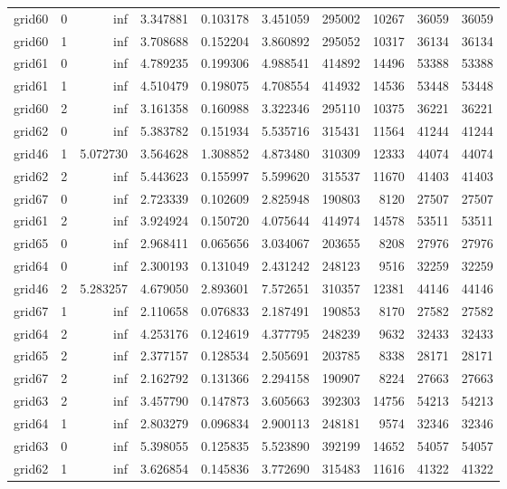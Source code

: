 \begin{longtable}{|l|r|r|r|r|r|r|r|r|r|}
grid60 & 0 & inf & 3.347881 & 0.103178 & 3.451059 & 295002 & 10267 & 36059 & 36059 \\
grid60 & 1 & inf & 3.708688 & 0.152204 & 3.860892 & 295052 & 10317 & 36134 & 36134 \\
grid61 & 0 & inf & 4.789235 & 0.199306 & 4.988541 & 414892 & 14496 & 53388 & 53388 \\
grid61 & 1 & inf & 4.510479 & 0.198075 & 4.708554 & 414932 & 14536 & 53448 & 53448 \\
grid60 & 2 & inf & 3.161358 & 0.160988 & 3.322346 & 295110 & 10375 & 36221 & 36221 \\
grid62 & 0 & inf & 5.383782 & 0.151934 & 5.535716 & 315431 & 11564 & 41244 & 41244 \\
grid46 & 1 & 5.072730 & 3.564628 & 1.308852 & 4.873480 & 310309 & 12333 & 44074 & 44074 \\
grid62 & 2 & inf & 5.443623 & 0.155997 & 5.599620 & 315537 & 11670 & 41403 & 41403 \\
grid67 & 0 & inf & 2.723339 & 0.102609 & 2.825948 & 190803 & 8120 & 27507 & 27507 \\
grid61 & 2 & inf & 3.924924 & 0.150720 & 4.075644 & 414974 & 14578 & 53511 & 53511 \\
grid65 & 0 & inf & 2.968411 & 0.065656 & 3.034067 & 203655 & 8208 & 27976 & 27976 \\
grid64 & 0 & inf & 2.300193 & 0.131049 & 2.431242 & 248123 & 9516 & 32259 & 32259 \\
grid46 & 2 & 5.283257 & 4.679050 & 2.893601 & 7.572651 & 310357 & 12381 & 44146 & 44146 \\
grid67 & 1 & inf & 2.110658 & 0.076833 & 2.187491 & 190853 & 8170 & 27582 & 27582 \\
grid64 & 2 & inf & 4.253176 & 0.124619 & 4.377795 & 248239 & 9632 & 32433 & 32433 \\
grid65 & 2 & inf & 2.377157 & 0.128534 & 2.505691 & 203785 & 8338 & 28171 & 28171 \\
grid67 & 2 & inf & 2.162792 & 0.131366 & 2.294158 & 190907 & 8224 & 27663 & 27663 \\
grid63 & 2 & inf & 3.457790 & 0.147873 & 3.605663 & 392303 & 14756 & 54213 & 54213 \\
grid64 & 1 & inf & 2.803279 & 0.096834 & 2.900113 & 248181 & 9574 & 32346 & 32346 \\
grid63 & 0 & inf & 5.398055 & 0.125835 & 5.523890 & 392199 & 14652 & 54057 & 54057 \\
grid62 & 1 & inf & 3.626854 & 0.145836 & 3.772690 & 315483 & 11616 & 41322 & 41322 \\

\end{longtable}
